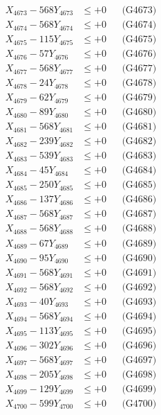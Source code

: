 \documentclass[a4paper,10pt]{article}
\begin{document}
{\begin{align}
X_{4673} - 568Y_{4673} &\leq +0 && \text{(G4673)} \\
X_{4674} - 568Y_{4674} &\leq +0 && \text{(G4674)} \\
X_{4675} - 115Y_{4675} &\leq +0 && \text{(G4675)} \\
X_{4676} - 57Y_{4676} &\leq +0 && \text{(G4676)} \\
X_{4677} - 568Y_{4677} &\leq +0 && \text{(G4677)} \\
X_{4678} - 24Y_{4678} &\leq +0 && \text{(G4678)} \\
X_{4679} - 62Y_{4679} &\leq +0 && \text{(G4679)} \\
X_{4680} - 89Y_{4680} &\leq +0 && \text{(G4680)} \\
\allowbreak
X_{4681} - 568Y_{4681} &\leq +0 && \text{(G4681)} \\
X_{4682} - 239Y_{4682} &\leq +0 && \text{(G4682)} \\
X_{4683} - 539Y_{4683} &\leq +0 && \text{(G4683)} \\
X_{4684} - 45Y_{4684} &\leq +0 && \text{(G4684)} \\
X_{4685} - 250Y_{4685} &\leq +0 && \text{(G4685)} \\
X_{4686} - 137Y_{4686} &\leq +0 && \text{(G4686)} \\
X_{4687} - 568Y_{4687} &\leq +0 && \text{(G4687)} \\
X_{4688} - 568Y_{4688} &\leq +0 && \text{(G4688)} \\
X_{4689} - 67Y_{4689} &\leq +0 && \text{(G4689)} \\
X_{4690} - 95Y_{4690} &\leq +0 && \text{(G4690)} \\
\allowbreak
X_{4691} - 568Y_{4691} &\leq +0 && \text{(G4691)} \\
X_{4692} - 568Y_{4692} &\leq +0 && \text{(G4692)} \\
X_{4693} - 40Y_{4693} &\leq +0 && \text{(G4693)} \\
X_{4694} - 568Y_{4694} &\leq +0 && \text{(G4694)} \\
X_{4695} - 113Y_{4695} &\leq +0 && \text{(G4695)} \\
X_{4696} - 302Y_{4696} &\leq +0 && \text{(G4696)} \\
X_{4697} - 568Y_{4697} &\leq +0 && \text{(G4697)} \\
X_{4698} - 205Y_{4698} &\leq +0 && \text{(G4698)} \\
X_{4699} - 129Y_{4699} &\leq +0 && \text{(G4699)} \\
X_{4700} - 599Y_{4700} &\leq +0 && \text{(G4700)} \\

\end{align}}
\end{document}
